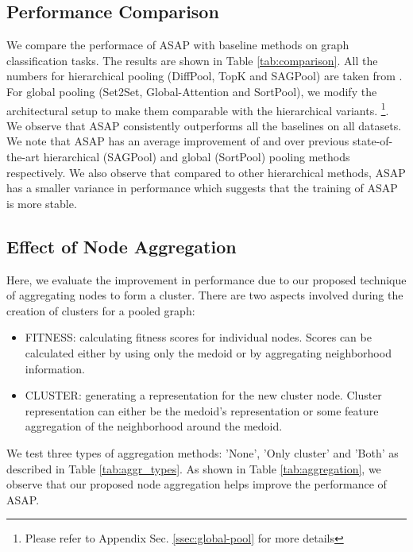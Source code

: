 \documentclass[letterpaper]{article} \usepackage{aaai20}  \usepackage{times}  \usepackage{helvet} \usepackage{courier}  \usepackage[hyphens]{url}  \usepackage{graphicx} \urlstyle{rm} \def\UrlFont{\rm}  \usepackage{graphicx}  \frenchspacing  \setlength{\pdfpagewidth}{8.5in}  \setlength{\pdfpageheight}{11in}
\begin{document}
\subsection{Performance Comparison}
\label{sec:results}
We compare the performace of ASAP with baseline methods on  graph classification tasks. The results are shown in Table \ref{tab:comparison}. All the numbers for hierarchical pooling (DiffPool, TopK and SAGPool) are taken from \cite{sag}. For global pooling (Set2Set, Global-Attention and SortPool), we modify the architectural setup to make them comparable with the hierarchical variants. \footnote{Please refer to Appendix Sec. \ref{ssec:global-pool} for more details}. We observe that ASAP consistently outperforms all the baselines on all  datasets. We note that ASAP has an average improvement of  and  over previous state-of-the-art hierarchical (SAGPool) and global (SortPool) pooling methods respectively. We also observe that compared to other hierarchical methods, ASAP has a smaller variance in performance which suggests that the training of ASAP is more stable.







\subsection{Effect of Node Aggregation}
\label{sec:ablation_aggr}
Here, we evaluate the improvement in performance due to our proposed technique of aggregating nodes to form a cluster. There are two aspects involved during the creation of clusters for a pooled graph:

\begin{itemize}
	\item FITNESS: calculating fitness scores for individual nodes. Scores can be calculated either by using only the medoid or by aggregating neighborhood information.
	\item CLUSTER: generating a representation for the new cluster node. Cluster representation can either be the medoid's representation or some feature aggregation of the neighborhood around the medoid.
\end{itemize}

\noindent We test three types of aggregation methods: 'None', 'Only cluster' and 'Both' as described in Table \ref{tab:aggr_types}. As shown in Table \ref{tab:aggregation}, we observe that our proposed node aggregation helps improve the performance of ASAP.
\end{document}
